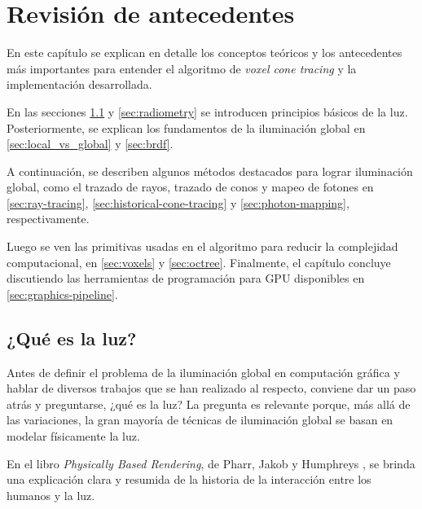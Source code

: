 \graphicspath{{chapters/2_antecedentes/figures/}}

\chapter{Revisión de antecedentes}


En este capítulo se explican en detalle los conceptos teóricos y los antecedentes más importantes para entender el algoritmo de \textit{voxel cone tracing} y la implementación desarrollada.

En las secciones \ref{sec:what-is-light} y \ref{sec:radiometry} se introducen principios básicos de la luz.
Posteriormente, se explican los fundamentos de la iluminación global en \ref{sec:local_vs_global} y \ref{sec:brdf}.

A continuación, se describen algunos métodos destacados para lograr iluminación global, como el trazado de rayos, trazado de conos y mapeo de fotones en \ref{sec:ray-tracing}, \ref{sec:historical-cone-tracing} y \ref{sec:photon-mapping}, respectivamente.

Luego se ven las primitivas usadas en el algoritmo para reducir la complejidad computacional, en \ref{sec:voxels} y \ref{sec:octree}.
Finalmente, el capítulo concluye discutiendo las herramientas de programación para GPU disponibles en \ref{sec:graphics-pipeline}.

\section{¿Qué es la luz?}\label{sec:what-is-light}

Antes de definir el problema de la iluminación global en computación gráfica y hablar de diversos trabajos que se han realizado al respecto, conviene dar un paso atrás y preguntarse, ¿qué es la luz?
La pregunta es relevante porque, más allá de las variaciones, la gran mayoría de técnicas de iluminación global se basan en modelar físicamente la luz.

En el libro \textit{Physically Based Rendering}, de Pharr, Jakob y Humphreys \cite[p.~177]{pbr}, se brinda una explicación clara y resumida de la historia de la interacción entre los humanos y la luz.

